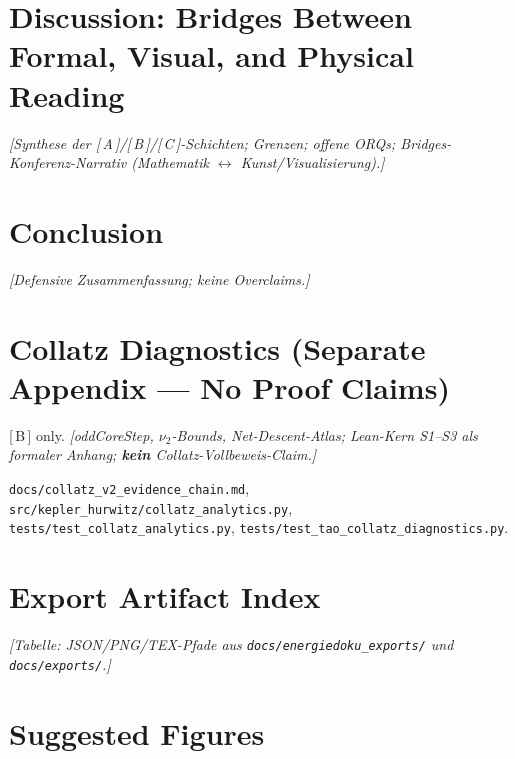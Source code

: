 \documentclass[11pt,a4paper]{article}
\newcommand{\evidence}[1]{\textnormal{[\,#1\,]}}
\newcommand{\placeholder}[1]{\textit{[#1]}}
\newcommand{\repo}[1]{\texttt{#1}}
\begin{document}
\section{Discussion: Bridges Between Formal, Visual, and Physical Reading}
\label{sec:discussion}

\placeholder{Synthese der \evidence{A}/\evidence{B}/\evidence{C}-Schichten;
Grenzen; offene ORQs; Bridges-Konferenz-Narrativ (Mathematik $\leftrightarrow$ Kunst/Visualisierung).}

\section{Conclusion}
\label{sec:conclusion}

\placeholder{Defensive Zusammenfassung; keine Overclaims.}

\appendix

\section{Collatz Diagnostics (Separate Appendix --- No Proof Claims)}
\label{app:collatz}

\evidence{B} only.
\placeholder{oddCoreStep, $\nu_2$-Bounds, Net-Descent-Atlas;
Lean-Kern S1--S3 als formaler Anhang;
\textbf{kein} Collatz-Vollbeweis-Claim.}

\repo{docs/collatz_v2_evidence_chain.md},
\repo{src/kepler_hurwitz/collatz_analytics.py},
\repo{tests/test_collatz_analytics.py},
\repo{tests/test_tao_collatz_diagnostics.py}.

\section{Export Artifact Index}
\label{app:exports}

\placeholder{Tabelle: JSON/PNG/TEX-Pfade aus \repo{docs/energiedoku_exports/} und \repo{docs/exports/}.}

\section*{Suggested Figures}
\end{document}
